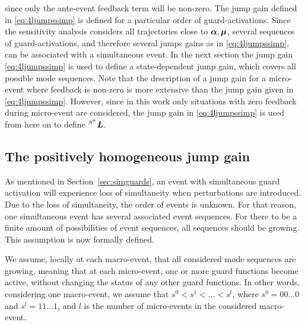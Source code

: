 \documentclass[../DC2017114Bouma.tex]{subfiles}
\begin{document}
since only the ante-event feedback term will be non-zero. The jump gain defined in \eqref{eq:4ljumpssimp} is defined for a particular order of guard-activations. Since the sensitivity analysis considers all trajectories close to $\boldsymbol{\alpha},\boldsymbol{\mu}$, several sequences of guard-activations, and therefore several jumps gains as in \eqref{eq:4ljumpssimp}, can be associated with a simultaneous event. In the next section the jump gain \eqref{eq:4ljumpssimp} is used to define a state-dependent jump gain, which covers all possible mode sequences. Note that the description of a jump gain for a micro-event where feedback is non-zero is more extensive than the jump gain given in \eqref{eq:4ljumpssimp}. However, since in this work only situations with zero feedback during micro-event are considered, the jump gain in \eqref{eq:4ljumpssimp} is used from here on to define $\hspace{0cm}^{S^k}{\boldsymbol{L}}$.

\subsection{The positively homogeneous jump gain}
As mentioned in Section~\ref{sec:simguards}, an event with simultaneous guard activation will experience loss of simultaneity when perturbations are introduced. Due to the loss of simultaneity, the order of events is unknown. For that reason, one simultaneous event has several associated event sequences. For there to be a finite amount of possibilities of event sequences, all sequences should be growing. This assumption is now formally defined.

\begin{myass}\label{ass:unidirectional}
We assume, locally at each macro-event, that all considered mode sequences are growing, meaning that at each micro-event, one or more guard functions become active, without changing the status of any other guard functions. In other words, considering one macro-event, we assume that $s^0<s^1<...<s^l$, where $s^0= 00...0$ and $s^l = 11...1$, and $l$ is the number of micro-events in the considered macro-event.
\end{myass}
\end{document}

